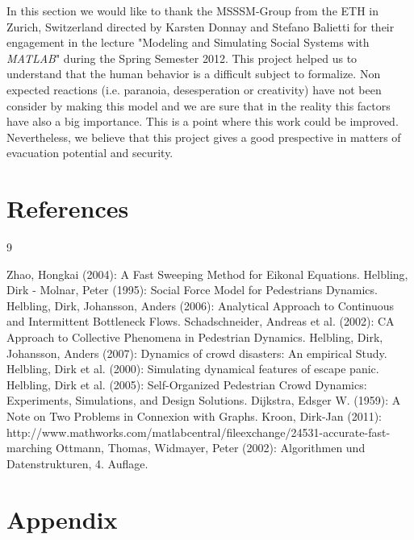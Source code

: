 \documentclass[11pt]{article}
\begin{document}
In this section we would like to thank the MSSSM-Group from the ETH in Zurich, Switzerland
directed by Karsten Donnay and Stefano Balietti for their engagement in the lecture
"Modeling and Simulating Social Systems with \textit{MATLAB}" during the Spring Semester 2012.
This project helped us to understand that the human behavior is a difficult subject to formalize.
Non expected reactions (i.e. paranoia, desesperation or creativity) have not been consider by
making this model and we are sure that in the reality this factors have also a big importance.
This is a point where this work could be improved. Nevertheless, we believe that this project
gives a good prespective in matters of evacuation potential and security.



\section{References}

\begin{thebibliography} {9}
	
	 Zhao, Hongkai (2004): A Fast Sweeping Method for Eikonal Equations.
	 Helbling, Dirk - Molnar, Peter (1995): Social Force Model for Pedestrians Dynamics.
	 Helbling, Dirk, Johansson, Anders (2006): Analytical Approach to Continuous and Intermittent Bottleneck Flows.
	 Schadschneider, Andreas et al. (2002): CA Approach to Collective Phenomena in Pedestrian Dynamics.	
	 Helbling, Dirk, Johansson, Anders (2007): Dynamics of crowd disasters: An empirical Study.
	 Helbling, Dirk et al. (2000): Simulating dynamical features of escape panic.
	 Helbling, Dirk et al. (2005): Self-Organized Pedestrian Crowd Dynamics: Experiments, Simulations, and Design Solutions.
	 Dijkstra, Edsger W. (1959): A Note on Two Problems in Connexion with Graphs.
	 Kroon, Dirk-Jan (2011): http://www.mathworks.com/matlabcentral/fileexchange/24531-accurate-fast-marching
	 Ottmann, Thomas, Widmayer, Peter (2002): Algorithmen und Datenstrukturen, 4. Auflage.

\end{thebibliography}


\section{Appendix}
\end{document}
